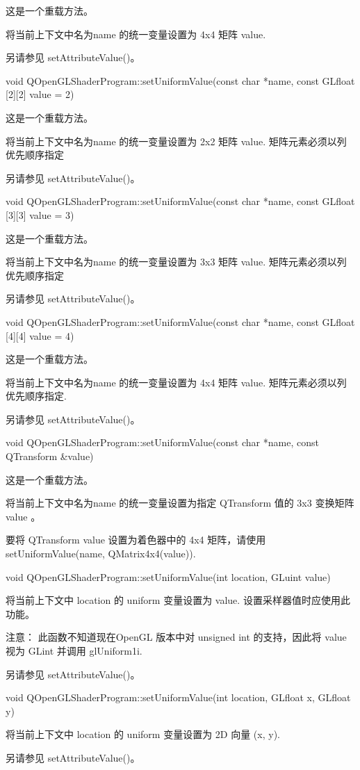 这是一个重载方法。

将当前上下文中名为name 的统一变量设置为 4x4 矩阵 value.

另请参见 setAttributeValue()。

void QOpenGLShaderProgram::setUniformValue(const char *name, const GLfloat [2][2] value = 2)

这是一个重载方法。

将当前上下文中名为name 的统一变量设置为 2x2 矩阵 value. 矩阵元素必须以列优先顺序指定

另请参见 setAttributeValue()。

void QOpenGLShaderProgram::setUniformValue(const char *name, const GLfloat [3][3] value = 3)

这是一个重载方法。

将当前上下文中名为name 的统一变量设置为 3x3 矩阵 value. 矩阵元素必须以列优先顺序指定

另请参见 setAttributeValue()。

void QOpenGLShaderProgram::setUniformValue(const char *name, const GLfloat [4][4] value = 4)

这是一个重载方法。

将当前上下文中名为name 的统一变量设置为 4x4 矩阵 value. 矩阵元素必须以列优先顺序指定.

另请参见 setAttributeValue()。

void QOpenGLShaderProgram::setUniformValue(const char *name, const QTransform \&value)

这是一个重载方法。

将当前上下文中名为name 的统一变量设置为指定 QTransform 值的 3x3 变换矩阵 value 。

要将 QTransform value 设置为着色器中的 4x4 矩阵，请使用 setUniformValue(name, QMatrix4x4(value)).

void QOpenGLShaderProgram::setUniformValue(int location, GLuint value)

将当前上下文中 location 的 uniform 变量设置为 value. 设置采样器值时应使用此功能。

注意： 此函数不知道现在OpenGL 版本中对 unsigned int 的支持，因此将 value 视为 GLint 并调用 glUniform1i.

另请参见 setAttributeValue()。

void QOpenGLShaderProgram::setUniformValue(int location, GLfloat x, GLfloat y)

将当前上下文中 location 的 uniform 变量设置为 2D 向量 (x, y).

另请参见 setAttributeValue()。

